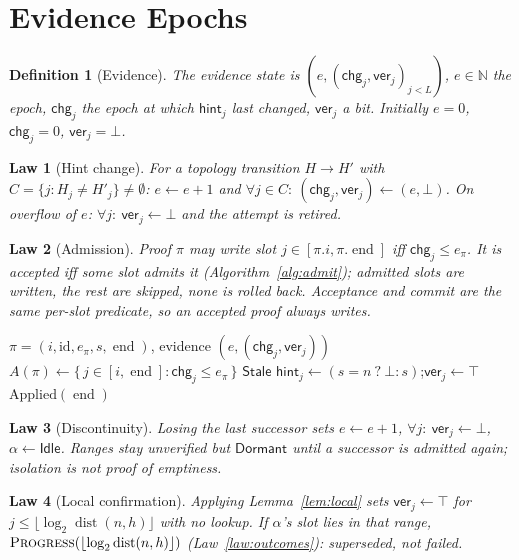 \documentclass[journal]{IEEEtran}
\newtheorem{definition}{Definition}
\newtheorem{law}{Law}
\newcommand{\dist}{\operatorname{dist}}
\newcommand{\pend}{\operatorname{end}}
\newcommand{\hint}{\mathsf{hint}}
\newcommand{\ver}{\mathsf{ver}}
\newcommand{\chg}{\mathsf{chg}}
\newcommand{\Idle}{\mathsf{Idle}}
\newcommand{\Dormant}{\mathsf{Dormant}}
\newcommand{\Stale}{\mathsf{Stale}}
\newcommand{\Admit}{\textsc{Admit}}
\newcommand{\Progress}{\textsc{Progress}}
\newcommand{\att}{\alpha}
\begin{document}
\section{Evidence Epochs}\label{sec:evidence}

\begin{definition}[Evidence]\label{def:evidence}
The evidence state is $(e,(\chg_j,\ver_j)_{j<L})$, $e\in\mathbb{N}$ the
epoch, $\chg_j$ the epoch at which $\hint_j$ last changed, $\ver_j$ a bit.
Initially $e=0$, $\chg_j=0$, $\ver_j=\bot$.
\end{definition}

\begin{law}[Hint change]\label{law:change}
For a topology transition $H\to H'$ with $C=\{j:H_j\ne H'_j\}\ne\emptyset$:
$e\gets e+1$ and $\forall j\in C:\ (\chg_j,\ver_j)\gets(e,\bot)$.  On
overflow of $e$: $\forall j:\ \ver_j\gets\bot$ and the attempt is retired.
\end{law}

\begin{law}[Admission]\label{law:admit}
Proof $\pi$ may write slot $j\in[\pi.i,\pi.\pend]$ iff $\chg_j\le e_\pi$.
It is accepted iff some slot admits it (Algorithm~\ref{alg:admit}); admitted
slots are written, the rest are skipped, none is rolled back.  Acceptance
and commit are the same per-slot predicate, so an accepted proof always
writes.
\end{law}

\begin{algorithm}[t]
\caption{$\Admit(\pi)$: commit a range proof slot-wise}
\label{alg:admit}
\begin{algorithmic}[1]
\Require $\pi=(i,\mathrm{id},e_\pi,s,\pend)$, evidence $(e,(\chg_j,\ver_j))$
\State $A(\pi)\gets\{\,j\in[i,\pend]:\chg_j\le e_\pi\,\}$
 \State \Return $\Stale$ \EndIf
{}
  \State $\hint_j\gets(s=n\ ?\ \bot:s)$;\quad $\ver_j\gets\top$
\EndFor
\State \Return $\mathrm{Applied}(\pend)$
\end{algorithmic}
\end{algorithm}

\begin{law}[Discontinuity]\label{law:discontinuity}
Losing the last successor sets $e\gets e+1$, $\forall j:\ \ver_j\gets\bot$,
$\att\gets\Idle$.  Ranges stay unverified but $\Dormant$ until a
successor is admitted again; isolation is not proof of emptiness.
\end{law}

\begin{law}[Local confirmation]\label{law:confirm}
Applying Lemma~\ref{lem:local} sets $\ver_j\gets\top$ for
$j\le\lfloor\log_2\dist(n,h)\rfloor$ with no lookup.  If $\att$'s slot lies in that
range, $\Progress(\lfloor\log_2\dist(n,h)\rfloor)$ (Law~\ref{law:outcomes}):
superseded, not failed.
\end{law}
\end{document}
